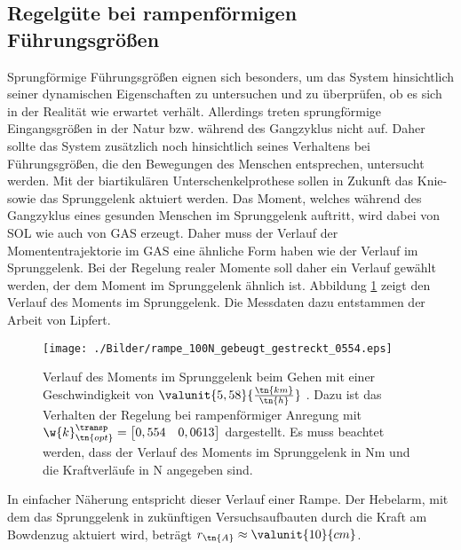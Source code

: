 \subsection{Regelgüte bei rampenförmigen Führungsgrößen}
Sprungförmige Führungsgrößen eignen sich besonders, um das System hinsichtlich seiner dynamischen Eigenschaften zu untersuchen und zu überprüfen, ob es sich in der Realität wie erwartet verhält. Allerdings treten sprungförmige Eingangsgrößen in der Natur bzw. während des Gangzyklus nicht auf. Daher sollte das System zusätzlich noch hinsichtlich seines Verhaltens bei Führungsgrößen, die den Bewegungen des Menschen entsprechen, untersucht werden. Mit der biartikulären Unterschenkelprothese sollen in Zukunft das Knie- sowie das Sprunggelenk aktuiert werden. Das Moment, welches während des Gangzyklus eines gesunden Menschen im Sprunggelenk auftritt, wird dabei von SOL wie auch von GAS erzeugt. Daher muss der Verlauf der Momententrajektorie im GAS eine ähnliche Form haben wie der Verlauf im Sprunggelenk. Bei der Regelung realer Momente soll daher ein Verlauf gewählt werden, der dem Moment im Sprunggelenk ähnlich ist. Abbildung \ref{fig:rampe} zeigt den Verlauf des Moments im Sprunggelenk. Die Messdaten dazu entstammen der Arbeit \cite{Lipfert.2010} von Lipfert.
\begin{figure}[H]
	\centering
	\texttt{[image: ./Bilder/rampe\_100N\_gebeugt\_gestreckt\_0554.eps]}
	\caption[rampe]{Verlauf des Moments im Sprunggelenk beim Gehen mit einer Geschwindigkeit von $\valunit{5,58}{\frac{\tn{km}}{\tn{h}}}$ \cite{Lipfert.2010}. Dazu ist das Verhalten der Regelung bei rampenförmiger Anregung mit $\w{k}_\tn{opt}^\transp = \begin{bmatrix} 0,554 & 0,0613\end{bmatrix}$ dargestellt. Es muss beachtet werden, dass der Verlauf des Moments im Sprunggelenk in \unit{Nm} und die Kraftverläufe in \unit{N} angegeben sind. }
	\label{fig:rampe}
\end{figure}
In einfacher Näherung entspricht dieser Verlauf einer Rampe. Der Hebelarm, mit dem das Sprunggelenk in zukünftigen Versuchsaufbauten durch die Kraft am Bowdenzug aktuiert wird, beträgt $r_\tn{A} \approx \valunit{10}{cm}$. 
